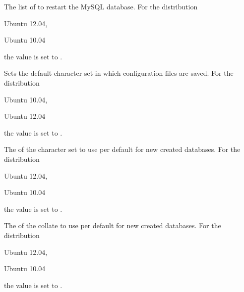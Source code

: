 
The list of  to restart the MySQL database.
For the distribution
\begin{inparaitem}
\item[\TheDistribution{ubuntu}] Ubuntu 12.04,
\item[\TheDistribution{ubuntu}] Ubuntu 10.04
\end{inparaitem}
the value is set to .


Sets the default character set  in which configuration files are 
saved. For the distribution
\begin{inparaitem}
\item[\TheDistribution{ubuntu}] Ubuntu 10.04,
\item[\TheDistribution{ubuntu}] Ubuntu 12.04
\end{inparaitem}
the value is set to .


The  of the character set to use per default for new created databases.
For the distribution
\begin{inparaitem}
\item[\TheDistribution{ubuntu}] Ubuntu 12.04,
\item[\TheDistribution{ubuntu}] Ubuntu 10.04
\end{inparaitem}
the value is set to .


The  of the collate to use per default for new created databases.
For the distribution
\begin{inparaitem}
\item[\TheDistribution{ubuntu}] Ubuntu 12.04,
\item[\TheDistribution{ubuntu}] Ubuntu 10.04
\end{inparaitem}
the value is set to .
 
